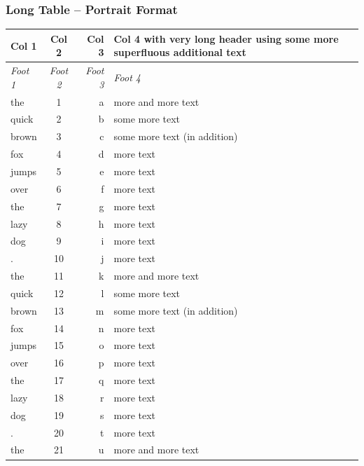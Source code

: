 \documentclass{pharmrep}
\begin{document}
\subsubsection{Long Table -- Portrait Format}\label{subsubsec:longtables}
\label{tab:longtable} %
\begin{tabularx}{\linewidth}{lcrX}
   \toprule
   \textbf{Col 1} &  \textbf{Col 2} &  \textbf{Col 3} & \textbf{Col 4 with very long header using some more
      superfluous additional text} \\\midrule\endhead
   \midrule
   \textit{Foot 1} & \textit{Foot 2} & \textit{Foot 3} & \textit{Foot 4} \\\bottomrule\endfoot
   the   & 1    & a     & more and more text \\ \midrule
   quick & 2     & b     & some more text \\ \midrule
   brown & 3     & c     & some more text (in addition) \\ \midrule
   fox   & 4     & d     & more text \\ \midrule
   jumps & 5     & e     & more text \\ \midrule
   over  & 6     & f     & more text \\ \midrule
   the   & 7     & g     & more text \\ \midrule
   lazy  & 8     & h     & more text \\ \midrule
   dog   & 9     & i     & more text \\ \midrule
   .     & 10    & j     & more text \\ \midrule
   the   & 11    & k     & more and more text \\ \midrule
   quick & 12    & l     & some more text \\ \midrule
   brown & 13    & m     & some more text (in addition) \\ \midrule
   fox   & 14    & n     & more text \\ \midrule
   jumps & 15    & o     & more text \\ \midrule
   over  & 16    & p     & more text \\ \midrule
   the   & 17    & q     & more text \\ \midrule
   lazy  & 18    & r     & more text \\ \midrule
   dog   & 19    & s     & more text \\ \midrule
   .     & 20    & t     & more text \\ \midrule
   the   & 21    & u     & more and more text \\ \midrule

\end{tabularx}
\end{document}
